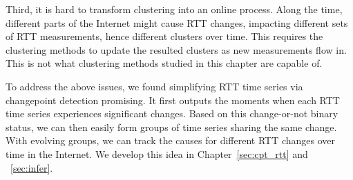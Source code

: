 Third, it is hard to transform clustering into an online process. Along the time, different parts of the Internet might cause RTT changes, impacting different sets of RTT measurements, hence different clusters over time. This requires the clustering methods to update the resulted clusters as new measurements flow in. This is not what clustering methods studied in this chapter are capable of.

To address the above issues, we found simplifying RTT time series via changepoint detection promising. It first outputs the moments when each RTT time series experiences significant changes. Based on this change-or-not binary status, we can then easily form groups of time series sharing the same change. With evolving groups, we can track the causes for different RTT changes over time in the Internet.
We develop this idea in Chapter~\ref{sec:cpt_rtt} and ~\ref{sec:infer}.
